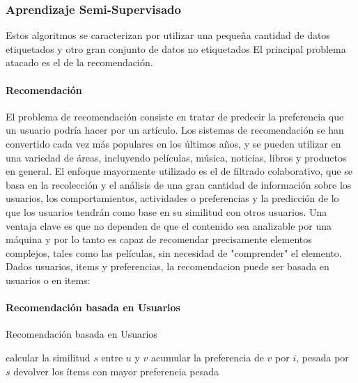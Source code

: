 \documentclass[a4paper,11pt,spanish]{book}
\begin{document}
      \subsubsection{Aprendizaje Semi-Supervisado}

	Estos algoritmos se caracterizan por utilizar una pequeña cantidad de datos etiquetados y otro gran conjunto de datos no etiquetados
	El principal problema atacado es el de la recomendación.
	\paragraph{Recomendación}
	  El problema de recomendación consiste en tratar de predecir la preferencia que un usuario podría hacer por un artículo. Los sistemas de recomendación se han convertido cada
	  vez más populares en los últimos años, y se pueden utilizar en una variedad de áreas, incluyendo películas, música, noticias, libros y productos en general.
	  El enfoque mayormente utilizado es el de filtrado colaborativo, que se basa en la recolección y el análisis de una gran cantidad de información sobre los usuarios,
	  los comportamientos, actividades o preferencias y la predicción de lo que los usuarios tendrán como base en su similitud con otros usuarios.
	  Una ventaja clave es que no dependen de que el contenido sea analizable por una máquina  y por lo tanto es capaz de recomendar precisamente elementos complejos,
	  tales como las películas, sin necesidad de "comprender" el elemento.
	  Dados usuarios, items y preferencias, la recomendacion puede ser basada en usuarios o en items:
	\paragraph {Recomendación basada en Usuarios}
	  \begin{algorithm}[h]
	    \caption{Recomendación basada en Usuarios}
	    \label{reco_user}
	    \begin{algorithmic}
		    \State calcular la similitud $s$ entre $u$ y $v$
		    \State acumular la preferencia de $v$ por $i$, pesada por $s$
		    \State devolver los ítems con mayor preferencia pesada
		\EndFor
	      \EndFor
	    \end{algorithmic}
	  \end{algorithm}
\end{document}
